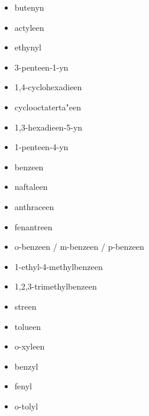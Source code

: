 \documentclass[a4paper,12pt]{article}
\begin{document}
\begin{enumerate}
\begin{itemize}
                \item butenyn
                \item actyleen
                \item ethynyl
                \item 3-penteen-1-yn                                                                                                                                                   
                \item 1,4-cyclohexadieen
                \item cyclooctaterta"een
                \item 1,3-hexadieen-5-yn
                \item 1-penteen-4-yn
                \item benzeen
                \item naftaleen
                \item anthraceen
                \item fenantreen
                \item o-benzeen / m-benzeen / p-benzeen
                \item 1-ethyl-4-methylbenzeen
                \item 1,2,3-trimethylbenzeen
                \item streen
                \item tolueen
                \item o-xyleen
                \item benzyl
                \item fenyl
                \item o-tolyl
            \end{itemize}
    \end{enumerate}
\end{document}
